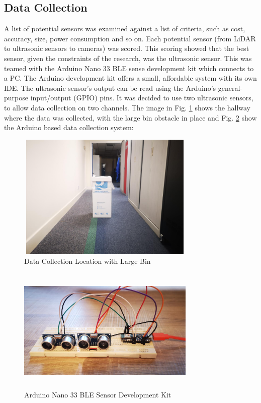\documentclass{svproc}
\begin{document}
\subsection{Data Collection}
A list of potential sensors was examined against a list of criteria, such as cost, accuracy, size, power consumption and so on. Each potential sensor (from LiDAR to ultrasonic 
sensors to cameras) was scored. This scoring showed that the best sensor, given the constraints of the research, 
was the ultrasonic sensor. This was teamed with the Arduino Nano 33 BLE sense development kit which connects to a PC. 
The Arduino development kit offers a small, affordable system with its own IDE. The ultrasonic sensor's output can be read using the 
Arduino's general-purpose input/output (GPIO) pins. It was decided to use two ultrasonic sensors, to allow data collection on two channels. 
The image in Fig. \ref{fig:collection1} shows the hallway where the data was collected, with the large bin obstacle in place 
and Fig. \ref{fig:collection2} show the Arduino based data collection system:    
\begin{figure}[ht]
\includegraphics[width=8.5cm, height=6cm]{images/hallway1.png}
\centering
\caption{Data Collection Location with Large Bin}
\label{fig:collection1}
\end{figure}

\begin{figure}[ht]
\includegraphics[width=8.5cm, height=6cm]{images/data_collection_system.png}
\centering
\caption{Arduino Nano 33 BLE Sensor Development Kit}
\label{fig:collection2}
\end{figure}
\end{document}
